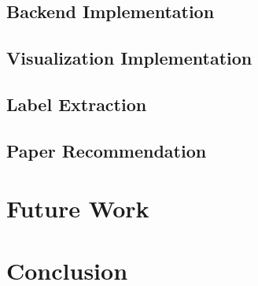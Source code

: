 \documentclass[a4paper, 10pt]{article}
\begin{document}
\subsection{Backend Implementation}
\subsection{Visualization Implementation}
\subsection{Label Extraction}
\subsection{Paper Recommendation}
\section{Future Work}
\section{Conclusion}

\newpage
\begin{appendices}
\end{appendices}
\end{document}
